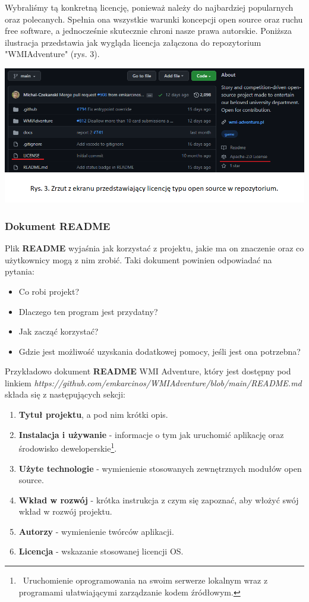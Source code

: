 \documentclass{article}
\begin{document}
Wybraliśmy tą konkretną licencję, ponieważ należy do najbardziej popularnych oraz polecanych. Spełnia ona wszystkie warunki koncepcji open source oraz ruchu free software, a jednocześnie skutecznie chroni nasze prawa autorskie. Poniższa ilustracja przedstawia jak wygląda licencja załączona do repozytorium "WMIAdventure" (rys. 3).
\begin{center}
    \includegraphics[width = 1\textwidth]{licencja.png}
\end{center}

\subsubsection{Dokument README}

\hspace{4mm} Plik \textbf{README} wyjaśnia jak korzystać z projektu, jakie ma on znaczenie oraz co użytkownicy mogą z nim zrobić. Taki dokument powinien odpowiadać na pytania\cite{opensource.guide}:
\begin{itemize}
    \item Co robi projekt?
    \item Dlaczego ten program jest przydatny?
    \item Jak zacząć korzystać?
    \item Gdzie jest możliwość uzyskania dodatkowej pomocy, jeśli jest ona potrzebna?
\end{itemize}

Przykładowo dokument \textbf{README} WMI Adventure, który jest dostępny pod linkiem \emph{https://github.com/emkarcinos/WMIAdventure/blob/main/README.md}\cite{wmi.readme} składa się z następujących sekcji:
\begin{enumerate}
    \item \textbf{Tytuł projektu}, a pod nim krótki opis.
    \item \textbf{Instalacja i używanie} - informacje o tym jak uruchomić aplikację oraz środowisko deweloperskie\footnote{\, Uruchomienie oprogramowania na swoim serwerze lokalnym wraz z programami ułatwiającymi zarządzanie kodem źródłowym.}.
    \item \textbf{Użyte technologie} - wymienienie stosowanych zewnętrznych modułów open source.
    \item \textbf{Wkład w rozwój} - krótka instrukcja z czym się zapoznać, aby włożyć swój wkład w rozwój projektu.
    \item \textbf{Autorzy} - wymienienie twórców aplikacji.
    \item \textbf{Licencja} - wskazanie stosowanej licencji OS.
\end{enumerate}
\end{document}
